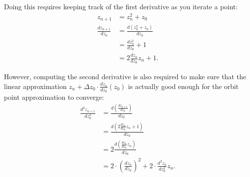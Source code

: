 \documentclass[12pt,a4paper]{article}
\newcommand{\eqar}[1]{\begin{align*} #1 \end{align*}}
\begin{document}
Doing this requires keeping track of the first derivative as you iterate a point:
\eqar{
	z_{n+1} &= z_n^2+z_0\\
	\frac{dz_{n+1}}{dz_0} &= \frac{d(z_n^2+z_0)}{dz_0}\\
	&= \frac{dz_n^2}{dz_0}+1\\
	&= 2\frac{dz_n}{dz_0}z_n+1.
}

However, computing the second derivative is also required to make sure that the linear approximation $z_n+\Delta z_0\cdot\frac{dz_n}{dz_0}(z_0)$ is actually good enough for the orbit point approximation to converge:
\eqar{
	\frac{d^2z_{n+1}}{dz_0^2} &= \frac{d(\frac{dz_{n+1}}{dz_0})}{dz_0}\\
	&= \frac{d(2\frac{dz_n}{dz_0}z_n+1)}{dz_0}\\
	&= 2\frac{d(\frac{dz_n}{dz_0}z_n)}{dz_0}\\
	&= 2\cdot(\frac{dz_n}{dz_0})^2+2\cdot\frac{d^2z_n}{dz_0^2}z_n.
}
\end{document}
